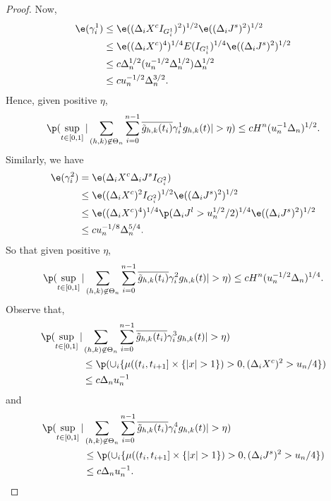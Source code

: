 \begin{proof}
Now,
\begin{align}
  \e(\gamma_i^1) &\le  \e( (\dxc  I_{G^1_i})^2)^{1/2} \e( (\djt)^2)^{1/2} \notag\\
  &\le  \e( (\dxc)^4)^{1/4}  E(I_{G^1_i})^{1/4} \e( (\djt)^2)^{1/2} \notag\\
  & \le c \Delta_n^{1/2} (u^{-1/2}_n \Delta_n^{1/2}) \Delta_n^{1/2} \notag \\
  & \le c u^{-1/2}_n \Delta_n^{3/2}.
  \label{}
\end{align}
Hence, given positive $\eta$, 
\begin{align} 
  \p( \sup_{t \in \domain}\vert \sumnt \sumin \btghki \gamma^1_i \ghk(t)\vert > \eta) \le cH^n (u^{-1}_n\Delta_n)^{1/2}. \notag \end{align}
Similarly, we have 
\begin{align}
  \e(\gamma_i^2) & =  \e(\dxc \djt I_{G^2_i}) \notag\\
  & \le \e((\dxc)^2 I_{G^2_i})^{1/2} \e((\djt)^2)^{1/2}\notag \\
  &\le \e((\dxc)^4)^{1/4} \p(\djl > u_n^{1/2}/2)^{1/4} \e((\djt)^2)^{1/2}\notag\\
  & \le  c u^{-1/8}_n \Delta_n^{5/4}\notag.
  \label{}
\end{align}
So that given positive $\eta$,
\begin{align} 
  \p( \sup_{t \in \domain}\vert \sumnt \sumin \btghki \gamma^2_i \ghk(t)\vert > \eta) \le cH^n (u^{-1/2}_n\Delta_n)^{1/4}. \notag \end{align}
Observe that, 
\begin{align}
\p( \sup_{t \in \domain}\vert &\sumnt \sumin \btghki \gamma^3_i  \ghk(t)\vert > \eta) \notag \\
&\le \p(    \cup_i\{ \mu( (t_i, t_{i+1}] \times \{\vert x \vert > 1 \} ) > 0,  (\dxc)^2 > u_n/4\}) \notag \\ & \le c \Delta_n u_n^{-1} \notag\end{align}
and
\begin{align}
\p( \sup_{t \in \domain}\vert &\sumnt \sumin \btghki \gamma^4_i  \ghk(t)\vert > \eta) \notag \\
&\le \p(    \cup_i\{ \mu( (t_i, t_{i+1}] \times \{\vert x \vert > 1 \} ) > 0,  (\djt)^2 > u_n/4\}) \notag \\ & \le c \Delta_n u_n^{-1}.\notag\end{align}

\begin{comment}


\end{comment}
\end{proof}
